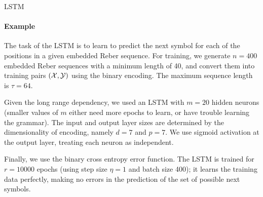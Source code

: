 \begin{frame}{LSTM}
\framesubtitle{Example}
    
    The task of the LSTM is to learn to predict the next symbol for each
    of the positions in a given embedded Reber sequence. 
    For training, we
    generate $n=400$ embedded Reber sequences with a minimum length of
    40, and convert them into
    training pairs $({\mathcal X}, {\mathcal Y})$ using the binary encoding.%
    The maximum sequence length is $\tau=64$. 

\medskip
    
    Given the long range dependency, we used an LSTM with $m=20$ hidden
    neurons (smaller values of $m$ either need more epochs to
    learn, or have trouble learning the grammar).
    The input and output layer sizes are
    determined by the dimensionality of encoding, namely $d= 7$ and
    $p=7$. We use sigmoid activation at the output layer, treating
    each neuron as independent. 

\medskip

Finally, we use  the binary cross
    entropy error function. The LSTM is trained for $r=10000$ epochs
    (using step size $\eta= 1$ and batch size 400); it 
    learns the training data perfectly, making no errors in the
    prediction of the set of possible next symbols. 
\end{frame}

